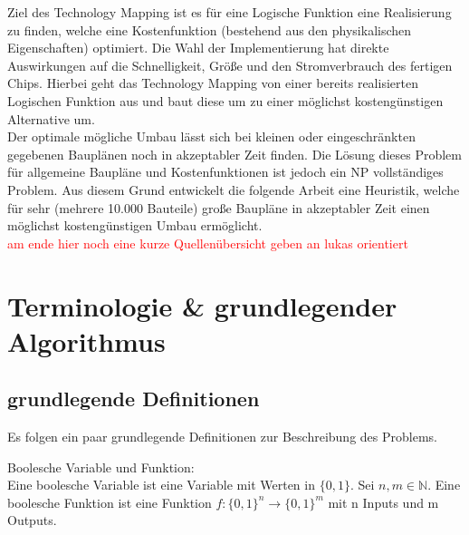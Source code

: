 \documentclass[11pt, a4paper, german]{article}
\newcommand{\TM}{Technology Mapping }
\begin{document}
Ziel des \TM ist es für eine Logische Funktion eine Realisierung zu finden, welche eine Kostenfunktion (bestehend aus den physikalischen Eigenschaften) optimiert. Die Wahl der Implementierung hat direkte Auswirkungen auf die  Schnelligkeit, Größe und den Stromverbrauch des fertigen Chips. Hierbei geht das \TM von einer bereits realisierten Logischen Funktion aus und baut diese um zu einer möglichst kostengünstigen Alternative um. \\
Der optimale mögliche Umbau lässt sich bei kleinen oder eingeschränkten gegebenen Bauplänen noch in akzeptabler Zeit finden. Die Lösung dieses Problem für allgemeine Baupläne und Kostenfunktionen ist jedoch ein NP vollständiges Problem. Aus diesem Grund entwickelt die folgende Arbeit eine Heuristik, welche für sehr (mehrere 10.000 Bauteile) große Baupläne in akzeptabler Zeit einen möglichst kostengünstigen Umbau ermöglicht.\\
\textcolor{red}{am ende hier noch eine kurze Quellenübersicht geben an lukas orientiert}

\newpage

\section{Terminologie \& grundlegender Algorithmus}
\label{sec:terminologie&grundl}
\subsection{grundlegende Definitionen}
\label{subsec:grundlegende_definitionen}
Es folgen ein paar grundlegende Definitionen zur Beschreibung des Problems.

\begin{definition}{Boolesche Variable und Funktion: } \\
Eine boolesche Variable ist eine Variable mit Werten in $ \{ 0 , 1 \} $.
Sei $ n, m \in \mathbb{N}$. Eine boolesche Funktion ist eine Funktion $ f : \{ 0 , 1 \}^n \rightarrow \{ 0 , 1 \}^m $ mit n Inputs und m Outputs. 
\end{definition}
\end{document}
